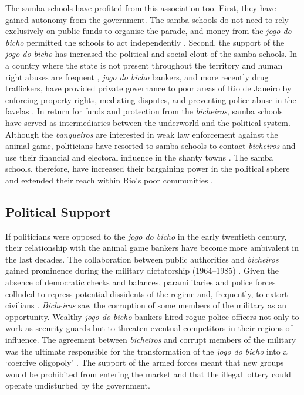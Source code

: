 The samba schools have profited from this association too. First, they have gained autonomy from the government. The samba schools do not need to rely exclusively on public funds to organise the parade, and money from the \emph{jogo do bicho} permitted the schools to act independently \citep[209]{chinelli1993vazio}. Second, the support of the \emph{jogo do bicho} has increased the political and social clout of the samba schools. In a country where the state is not present throughout the territory and human right abuses are frequent \citep{ahnen2003,odonnell1993state,pinheiro2000,pinheiro2001}, \emph{jogo do bicho} bankers, and more recently drug traffickers, have provided private governance to poor areas of Rio de Janeiro by enforcing property rights, mediating disputes, and preventing police abuse in the favelas \citep{arias2006dynamics,goldstein2013laughter,leeds1996cocaine}. In return for funds and protection from the \emph{bicheiros}, samba schools have served as intermediaries between the underworld and the political system. Although the \emph{banqueiros} are interested in weak law enforcement against the animal game, politicians have resorted to samba schools to contact \emph{bicheiros} and use their financial and electoral influence in the shanty towns \citep[17]{misse2011crime}. The samba schools, therefore, have increased their bargaining power in the political sphere and extended their reach within Rio's poor communities \citep[215]{chinelli1993vazio}.

\subsection{Political Support}

If politicians were opposed to the \emph{jogo do bicho} in the early twentieth century, their relationship with the animal game bankers have become more ambivalent in the last decades. The collaboration between public authorities and \emph{bicheiros} gained prominence during the military dictatorship (1964--1985) \citetext{\citealp{gaspari2002ditadura}; \citealp{jupiara2015poroes}; \citealp[39]{zaluar2007democratizaccao}}. Given the absence of democratic checks and balances, paramilitaries and police forces colluded to repress potential dissidents of the regime and, frequently, to extort civilians \citep{gorender1999combate,magalhaes1997logica,misse2009acumulaccao,skidmore1990politics}. \emph{Bicheiros} saw the corruption of some members of the military as an opportunity. Wealthy \emph{jogo do bicho} bankers hired rogue police officers not only to work as security guards but to threaten eventual competitors in their regions of influence. The agreement between \emph{bicheiros} and corrupt members of the military was the ultimate responsible for the transformation of the \emph{jogo do bicho} into a `coercive oligopoly' \citep{jupiara2015poroes}. The support of the armed forces meant that new groups would be prohibited from entering the market and that the illegal lottery could operate undisturbed by the government.

